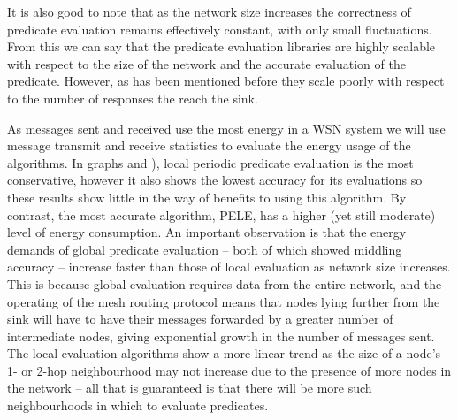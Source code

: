 It is also good to note that as the network size increases the correctness of predicate evaluation remains effectively constant, with only small fluctuations. From this we can say that the predicate evaluation libraries are highly scalable with respect to the size of the network and the accurate evaluation of the predicate. However, as has been mentioned before they scale poorly with respect to the number of responses the reach the sink.

As messages sent and received use the most energy in a WSN system \cite{Shnayder04} we will use message transmit and receive statistics to evaluate the energy usage of the algorithms. In graphs  and  ), local periodic predicate evaluation is the most conservative, however it also shows the lowest accuracy for its evaluations so these results show little in the way of benefits to using this algorithm. By contrast, the most accurate algorithm, PELE, has a higher (yet still moderate) level of energy consumption. An important observation is that the energy demands of global predicate evaluation -- both of which showed middling accuracy -- increase faster than those of local evaluation as network size increases. This is because global evaluation requires data from the entire network, and the operating of the mesh routing protocol means that nodes lying further from the sink will have to have their messages forwarded by a greater number of intermediate nodes, giving exponential growth in the number of messages sent. The local evaluation algorithms show a more linear trend as the size of a node's 1- or 2-hop neighbourhood may not increase due to the presence of more nodes in the network -- all that is guaranteed is that there will be more such neighbourhoods in which to evaluate predicates.

